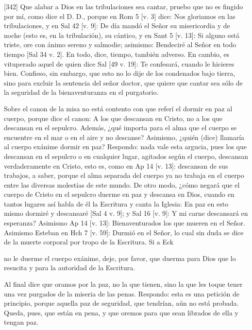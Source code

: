 [342] Que alabar a Dios en las tribulaciones sea cantar, pruebo que no es fingido por mí, como dice el D. D., porque en Rom 5 [v. 3] dice: Nos gloriamos en las tribulaciones, y en Sal 42 [v. 9]: De día mandó el Señor su misericordia y de noche (esto es, en la tribulación), su cántico, y en Sant 5 [v. 13]: Si alguno está triste, ore con ánimo sereno y salmodie; asimismo: Bendeciré al Señor en todo tiempo [Sal 34 v. 2]. En todo, dice, tiempo, también adverso. En cambio, es vituperado aquel de quien dice Sal [49 v. 19]: Te confesará, cuando le hicieres bien. Confieso, sin embargo, que esto no lo dije de los condenados bajo tierra, sino para excluir la sentencia del señor doctor, que quiere que cantar sea sólo de la seguridad de la bienaventuranza en el purgatorio.

Sobre el canon de la misa no está contento con que referí el dormir en paz al cuerpo, porque dice el canon: A los que descansan en Cristo, no a los que descansan en el sepulcro. Además, ¿qué importa para el alma que el cuerpo se encuentre en el mar o en el aire y no descanse? Asimismo, ¿quién (dice) llamaría al cuerpo exánime dormir en paz? Respondo: nada vale esta argucia, pues los que descansan en el sepulcro o en cualquier lugar, agitados según el cuerpo, descansan verdaderamente en Cristo, esto es, como en Ap 14 [v. 13]: descansan de sus trabajos, a saber, porque el alma separada del cuerpo ya no trabaja en el cuerpo entre las diversas molestias de este mundo. De otro modo, ¿cómo negará que el cuerpo de Cristo en el sepulcro duerme en paz y descansa en Dios, cuando en tantos lugares así habla de él la Escritura y canta la Iglesia: En paz en esto mismo dormiré y descansaré [Sal 4 v. 9]; y Sal 16 [v. 9]: Y mi carne descansará en esperanza? Asimismo Ap 14 [v. 13]: Bienaventurados los que mueren en el Señor. Asimismo Esteban en Hch 7 [v. 59]: Durmió en el Señor, lo cual sin duda se dice de la muerte corporal por tropo de la Escritura. Si a Eck

no le duerme el cuerpo exánime, deje, por favor, que duerma para Dios que lo resucita y para la autoridad de la Escritura.

Al final dice que oramos por la paz, no la que tienen, sino la que les toque tener una vez purgados de la miseria de las penas. Respondo: esta es una petición de principio, porque aquella paz de seguridad, que tendrían, aún no está probada. Queda, pues, que están en pena, y que oremos para que sean librados de ella y tengan paz.

